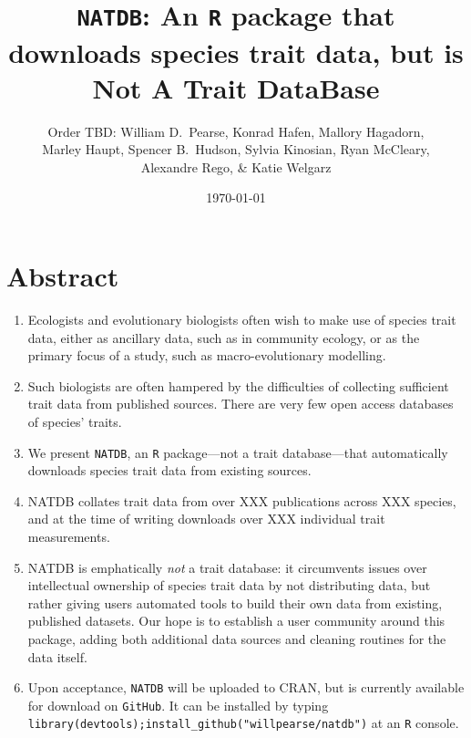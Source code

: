 \documentclass[12pt]{report}
\newcommand{\GitHub}{\texttt{GitHub}\xspace}
\newcommand{\R}{\texttt{R}\xspace}
\newcommand{\natdb}{\texttt{NATDB}\xspace}
\begin{document}
\title{\natdb : An \R package that downloads species trait data, but
  is Not A Trait DataBase} \author{Order TBD: William D.\ Pearse,
  Konrad Hafen, Mallory Hagadorn,\\ Marley Haupt, Spencer B.\ Hudson,
  Sylvia Kinosian, Ryan McCleary,\\ Alexandre Rego, \& Katie Welgarz}
\date{\today}
\maketitle

\section{Abstract}
\begin{enumerate}
\item Ecologists and evolutionary biologists often wish to make use of
  species trait data, either as ancillary data, such as in community
  ecology, or as the primary focus of a study, such as
  macro-evolutionary modelling.
\item Such biologists are often hampered by the difficulties of
  collecting sufficient trait data from published sources. There are
  very few open access databases of species' traits.
\item We present \natdb, an \R package---not a trait database---that
  automatically downloads species trait data from existing sources.
\item NATDB collates trait data from over XXX publications across XXX
  species, and at the time of writing downloads over XXX individual
  trait measurements.
\item NATDB is emphatically \emph{not} a trait database: it
  circumvents issues over intellectual ownership of species trait
  data by not distributing data, but rather giving users automated
  tools to build their own data from existing, published datasets. Our
  hope is to establish a user community around this package, adding
  both additional data sources and cleaning routines for the data
  itself.
\item Upon acceptance, \natdb will be uploaded to CRAN, but is
  currently available for download on \GitHub. It can be installed by
  typing
  \texttt{library(devtools);install\_github("willpearse/natdb")} at an
  \R console.
\end{enumerate}
\end{document}
